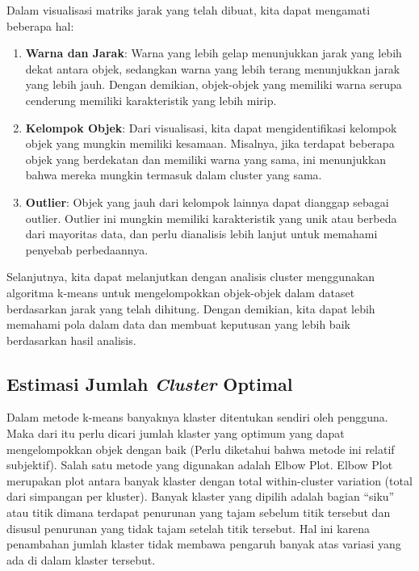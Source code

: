 \documentclass[
  oneside]{book}
\begin{document}
Dalam visualisasi matriks jarak yang telah dibuat, kita dapat mengamati beberapa hal:

\begin{enumerate}
\def\labelenumi{\arabic{enumi}.}
\item
  \textbf{Warna dan Jarak}:
  Warna yang lebih gelap menunjukkan jarak yang lebih dekat antara objek, sedangkan warna yang lebih terang menunjukkan jarak yang lebih jauh. Dengan demikian, objek-objek yang memiliki warna serupa cenderung memiliki karakteristik yang lebih mirip.
\item
  \textbf{Kelompok Objek}:
  Dari visualisasi, kita dapat mengidentifikasi kelompok objek yang mungkin memiliki kesamaan. Misalnya, jika terdapat beberapa objek yang berdekatan dan memiliki warna yang sama, ini menunjukkan bahwa mereka mungkin termasuk dalam cluster yang sama.
\item
  \textbf{Outlier}:
  Objek yang jauh dari kelompok lainnya dapat dianggap sebagai outlier. Outlier ini mungkin memiliki karakteristik yang unik atau berbeda dari mayoritas data, dan perlu dianalisis lebih lanjut untuk memahami penyebab perbedaannya.
\end{enumerate}

Selanjutnya, kita dapat melanjutkan dengan analisis cluster menggunakan algoritma k-means untuk mengelompokkan objek-objek dalam dataset berdasarkan jarak yang telah dihitung. Dengan demikian, kita dapat lebih memahami pola dalam data dan membuat keputusan yang lebih baik berdasarkan hasil analisis.

\subsection*{\texorpdfstring{Estimasi Jumlah \emph{Cluster} Optimal}{Estimasi Jumlah Cluster Optimal}}\label{estimasi-jumlah-cluster-optimal}

Dalam metode k-means banyaknya klaster ditentukan sendiri oleh pengguna. Maka dari itu perlu dicari jumlah klaster yang optimum yang dapat mengelompokkan objek dengan baik (Perlu diketahui bahwa metode ini relatif subjektif). Salah satu metode yang digunakan adalah Elbow Plot. Elbow Plot merupakan plot antara banyak klaster dengan total within-cluster variation (total dari simpangan per kluster). Banyak klaster yang dipilih adalah bagian ``siku'' atau titik dimana terdapat penurunan yang tajam sebelum titik tersebut dan disusul penurunan yang tidak tajam setelah titik tersebut. Hal ini karena penambahan jumlah klaster tidak membawa pengaruh banyak atas variasi yang ada di dalam klaster tersebut.
\end{document}
